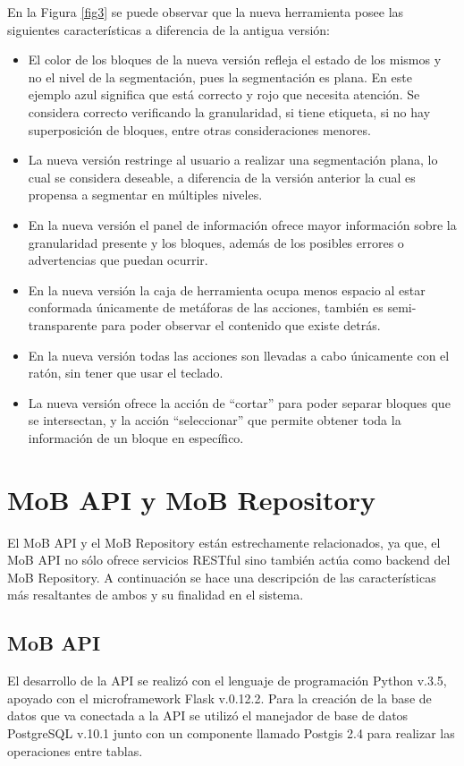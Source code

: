 \documentclass[10pt]{revecom}
\begin{document}
En la Figura \ref{fig3} se puede observar que la nueva herramienta posee las siguientes características a diferencia de la antigua versión:
\begin{itemize}
\item El color de los bloques de la nueva versión refleja el estado de los mismos y no el nivel de la segmentación, pues la segmentación es plana. En este ejemplo azul significa que está correcto y rojo que necesita atención. Se considera correcto verificando la granularidad, si tiene etiqueta, si no hay superposición de bloques, entre otras consideraciones menores.
\item La nueva versión restringe al usuario a realizar una segmentación plana, lo cual se considera deseable, a diferencia de la versión anterior la cual es propensa a segmentar en múltiples niveles.    
\item En la nueva versión el panel de información ofrece mayor información sobre la granularidad presente y los bloques, además de los posibles errores o advertencias que puedan ocurrir. 
\item En la nueva versión la caja de herramienta ocupa menos espacio al estar conformada únicamente de metáforas de las acciones, también es semi-transparente para poder observar el contenido que existe detrás.
\item En la nueva versión todas las acciones son llevadas a cabo únicamente con el ratón, sin tener que usar el teclado. 
\item La nueva versión ofrece la acción de ``cortar'' para poder separar bloques que se intersectan, y la acción ``seleccionar'' que permite obtener toda la información de un bloque en específico.  
\end{itemize}

\section{MoB API y MoB Repository}
\label{api_repo}
El MoB API y el MoB Repository están estrechamente relacionados, ya que, el MoB API no sólo ofrece servicios RESTful sino también actúa como backend del MoB Repository. A continuación se hace una descripción de las características más resaltantes de ambos y su finalidad en el sistema. 

\subsection{MoB API}
El desarrollo de la API se realizó con el lenguaje de programación Python v.3.5, apoyado con el microframework Flask v.0.12.2. Para la creación de la base de datos que va conectada a la API se utilizó el manejador de base de datos PostgreSQL v.10.1 junto con un componente llamado Postgis 2.4 para realizar las operaciones entre tablas.
\end{document}
